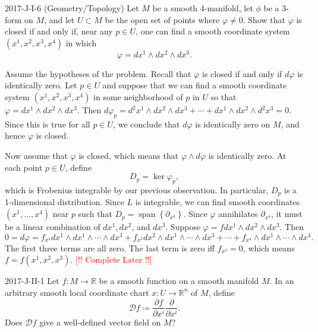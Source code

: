 \documentclass{article}
\begin{document}
\begin{prb}{2017-J-I-6 (Geometry/Topology)}
	Let $M$ be a smooth 4-manifold, let $\phi$ be a 3-form on $M$, and let $U\subset M$ be the open set of points where $\varphi \neq 0$. Show that $\varphi$ is closed if and only if, near any $p\in U$, one can find a smooth coordinate system $(x^{1}, x^{2}, x^{3}, x^{4})$ in which $$\varphi = dx^{1} \wedge dx^{2} \wedge dx^{3}.$$
\end{prb}
\begin{solutions}
	Assume the hypotheses of the problem. Recall that $\varphi$ is closed if and only if $d\varphi$ is identically zero. Let $p \in U$ and suppose that we can find a smooth coordinate system $(x^{1}, x^{2}, x^{3}, x^{4})$ in some neighborhood of $p$ in $U$ so that  $\varphi = dx^{1} \wedge dx^{2} \wedge dx^{3}$. Then $d\varphi_{p} = d^{2}x^{1} \wedge dx^{2} \wedge dx^{3} + \dotsm + dx^{1} \wedge dx^{2} \wedge d^{2}x^{3} = 0$. Since this is true for all $p \in U$, we conclude that $d\varphi$ is identically zero on $M$, and hence $\varphi$ is closed. 
	
	Now assume that $\varphi$ is closed, which means that $\varphi \wedge d\varphi$ is identically zero. At each point $p \in U$, define $$D_{p} = \ker{\varphi_{p}},$$ which is Frobenius integrable by our previous observation. In particular, $D_{p}$ is a 1-dimensional distribution. Since $L$ is integrable, we can find smooth coordinates $(x^{1}, \ldots, x^{4})$ near $p$ such that $D_{p} = \operatorname{span}\left\{\partial_{x^{4}}\right\}$. Since $\varphi$ annihilates $\partial_{x^{4}}$, it must be a linear combination of $dx^{1}, dx^{2}$, and $dx^{3}$. Suppose $\varphi = f dx^{1} \wedge dx^{2} \wedge dx^{3}$. Then 
		\begin{equation}
			0 = d\varphi = f_{x^{1}}dx^{1} \wedge dx^{1} \wedge \dotsm \wedge dx^{3} + f_{x^{2}}dx^{2} \wedge dx^{1} \wedge \dotsm \wedge dx^{3} + \dotsm +  f_{x^{4}} \wedge dx^{1} \wedge \dotsm \wedge dx^{4}. 
		\end{equation}
	The first  three terms are all zero. The last term is zero iff $f_{x^{4}} = 0$, which means $f = f(x^{1}, x^{2}, x^{3})$. \textcolor{red}{[!! Complete Later !!]} 
\end{solutions}
\begin{prb}{2017-J-II-1}
	Let $f: M \to \mathbb{R}$ be a smooth function on a smooth manifold $M$. In an arbitrary smooth local coordinate chart $x: U \to \mathbb{R}^{n}$ of $M$, define 
		\begin{equation*}
			\mathscr{D}f \coloneqq \frac{\partial f}{\partial x^{i}}\frac{\partial}{\partial x^{i}}. 
		\end{equation*}
	Does $\mathscr{D}f$ give a well-defined vector field on $M$? 
\end{prb}
\end{document}
